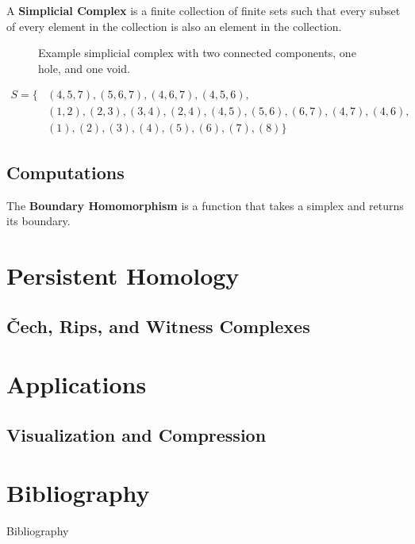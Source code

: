 \begin{frame}
	\begin{definition}
		A \textbf{Simplicial Complex} is a finite collection of finite sets such that every subset of every element in the collection is also an element in the collection. \cite{wagner}
	\end{definition}
	\begin{figure}
		
		\caption{Example simplicial complex with two connected components, one hole, and one void.}
	\end{figure}
	\begin{align*}
		S = \{
			&(4,5,7), (5,6,7), (4,6,7), (4,5,6),\\
			&(1,2), (2,3), (3,4), (2,4), (4,5), (5,6),
			(6,7), (4,7),(4,6),\\
			&(1), (2), (3), (4), (5), (6), (7), (8)
		\}
	\end{align*}
\end{frame}

\subsection{Computations}
\begin{frame}
	\begin{definition}
		The \textbf{Boundary Homomorphism} is a function that takes a simplex and returns its boundary.
	\end{definition}
\end{frame}


\section[Persistence]{Persistent Homology}
\subsection{\v{C}ech, Rips, and Witness Complexes}
\begin{frame}
\end{frame}

\section{Applications}
\subsection{Visualization and Compression}
\begin{frame}
\end{frame}

\section*{Bibliography}
\begin{frame}{Bibliography}
	\nocite{wagner}
	\nocite{hatcher}
	\nocite{fraleigha}
	\nocite{singh}
	\begingroup
	\renewcommand{\section}[2]{}%
	
	\endgroup
\end{frame}





